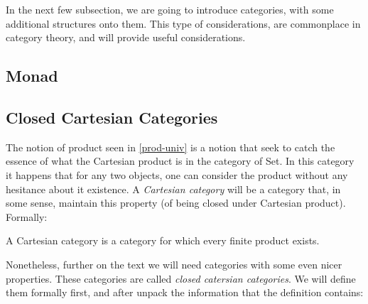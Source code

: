   In the next few subsection, we are going to introduce categories, with some additional structures onto them. This type of considerations, are commonplace in category theory, and will provide useful considerations.

  \subsection{Monad}
  


  \subsection{Closed Cartesian Categories}

  The notion of product seen in \ref{prod-univ} is a notion that seek to catch the essence of what the Cartesian product is in the category of Set. In this category it happens that for any two objects, one can consider the product without any hesitance about it existence. A \emph{Cartesian category} will be a category that, in some sense, maintain this property (of being closed under Cartesian product). Formally: 
  \begin{definition}
    A Cartesian category is a category for which every finite product exists.
  \end{definition}

Nonetheless, further on the text we will need categories with some even nicer properties. These categories are called \emph{closed catersian categories}. We will define them formally first, and after unpack the information that the definition contains:
  
